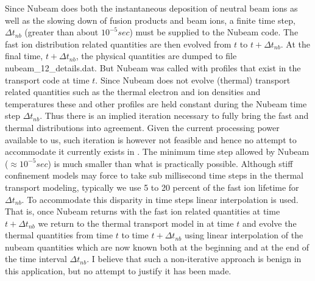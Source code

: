    Since Nubeam does both the  instantaneous deposition of neutral beam
   ions as well as the slowing  down  of fusion products and beam ions,
   a finite time step, $\Delta t_{nb}$ (greater than about $10^{-5} sec $) must be
   supplied to the Nubeam code. The fast ion distribution related
   quantities are then evolved from $t$ to $ t+\Delta t_{nb}$.
   At the final time, $t+\Delta t_{nb}$, the physical quantities are
   dumped to file nubeam\_12\_details.dat. But Nubeam was called
   with profiles that exist in the transport code at time $t$.
   Since Nubeam does not evolve (thermal) transport related quantities such as the
   thermal electron and ion  densities and temperatures these and
   other profiles  are held constant  during the Nubeam time step $\Delta
   t_{nb}$. Thus there is an implied iteration necessary to fully bring
   the fast and thermal distributions into agreement. Given the current
   processing power available to us, such iteration is however not
   feasible and hence no  attempt to accommodate it currently exists in
   \ot. The minimum time step allowed by Nubeam ($ \approx
   10^{-5} sec$) is much smaller than what is practically possible.
   Although stiff confinement models may force \ot to take sub millisecond
   time steps in the thermal transport modeling, typically we use 5 to
   20 percent of the fast ion lifetime for $\Delta t_{nb}$.
   To accommodate this disparity in time steps linear interpolation is
   used. That is, once Nubeam returns with the fast ion related
   quantities at time  $t+\Delta t_{nb}$ we return to the thermal
   transport model in \ot at time $t$ and evolve the thermal
   quantities from time $t$ to time   $t+\Delta t_{nb}$ using linear
   interpolation of the nubeam quantities which are now known both at
   the beginning and at the end of the time interval $\Delta t_{nb}$.
   I believe  that such a non-iterative approach is benign in this
   application, but no attempt to justify it has been made.


